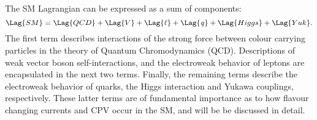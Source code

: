 The SM Lagrangian can be expressed as a sum of components:
\begin{equation}
  \Lag{SM} = \Lag{QCD} + \Lag{V} + \Lag{\ell} + \Lag{\it q} + \Lag{Higgs} + \Lag{Yuk}.
  \label{eq:th:lag}
\end{equation}
The first term describes interactions of the strong force between colour carrying particles in the
theory of Quantum Chromodynamics (QCD).
Descriptions of weak vector boson self-interactions, and the electroweak behavior of
leptons are encapsulated in the next two terms.
Finally, the remaining terms describe the electroweak behavior of quarks, the Higgs interaction and
Yukawa couplings, respectively.
These latter terms are of fundamental importance as to how flavour changing currents and CPV
occur in the SM, and will be be discussed in detail.

%

